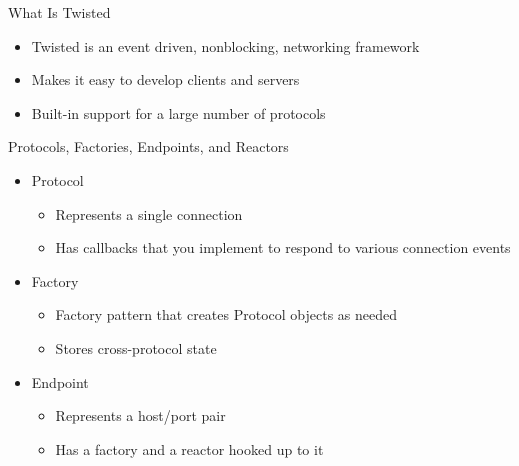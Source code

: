 \documentclass{seminar}
\begin{document}
    \begin{slide}
        \begin{center}{\LARGE What Is Twisted}\end{center}
        \vspace{1em}
        \begin{itemize}
            \item Twisted is an event driven, nonblocking, networking framework
            \item Makes it easy to develop clients and servers
            \item Built-in support for a large number of protocols
        \end{itemize}
    \end{slide}

    \begin{slide}
        \begin{center}{\LARGE Protocols, Factories, Endpoints, and Reactors}\end{center}
        \vspace{1em}
        \begin{itemize}
            \item Protocol
                \begin{itemize}
                    \item Represents a single connection
                    \item Has callbacks that you implement to respond to various connection events
                \end{itemize}

            \item Factory
                \begin{itemize}
                    \item Factory pattern that creates Protocol objects as needed
                    \item Stores cross-protocol state
                \end{itemize}

            \item Endpoint
                \begin{itemize}
                    \item Represents a host/port pair
                    \item Has a factory and a reactor hooked up to it
                \end{itemize}
            


        \end{itemize}
    \end{slide}
    
\end{document}
